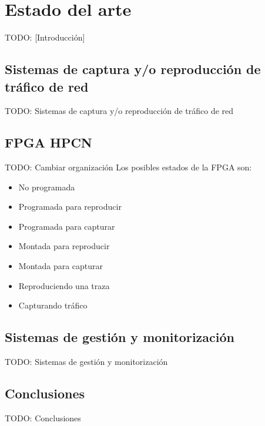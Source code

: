 \chapter{Estado del arte\label{cap:estadoDelArte}}

TODO: [Introducción]


\section{Sistemas de captura y/o reproducción de tráfico de red\label{sec:eda:sistemas_captura_reproducccion}}

TODO: Sistemas de captura y/o reproducción de tráfico de red

\section{FPGA HPCN\label{ssec:eda:fpga}}
TODO: Cambiar organización
Los posibles estados de la \gls{FPGA} son:
\begin{itemize}\label{fpga:estados}
  \item No programada
  \item Programada para reproducir
  \item Programada para capturar
  \item Montada para reproducir
  \item Montada para capturar
  \item Reproduciendo una \gls{traza}
  \item Capturando tráfico
\end{itemize}

\section{Sistemas de gestión y monitorización\label{sec:eda:sistemas_gestion_monitorizacion}}

TODO: Sistemas de gestión y monitorización


\section{Conclusiones\label{sec:eda:conclusiones}}

TODO: Conclusiones